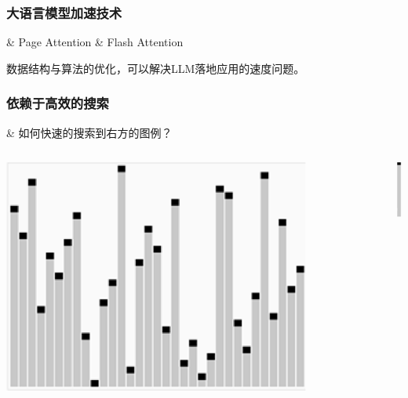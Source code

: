 \begin{frame}[fragile]
  \frametitle{大语言模型加速技术}
  \begin{easylist}
    & Page Attention
   & Flash Attention
  \end{easylist}

  数据结构与算法的优化，可以解决LLM落地应用的速度问题。
\end{frame}

\begin{frame}[fragile]
  \frametitle{依赖于高效的搜索}
  \begin{easylist}
    & 如何快速的搜索到右方的图例？
  \end{easylist}

    \begin{columns}
    \begin{column}[T]{.6\linewidth}
      \includegraphics[width=0.8\textwidth]{figs/intro/sort_demo_1.png}
    \end{column}
    \begin{column}[T]{.5\linewidth}
      \vspace{2cm}
      \includegraphics[width=0.2cm]{figs/intro/sort_demo_2.png}
    \end{column}
  \end{columns}

\end{frame}


